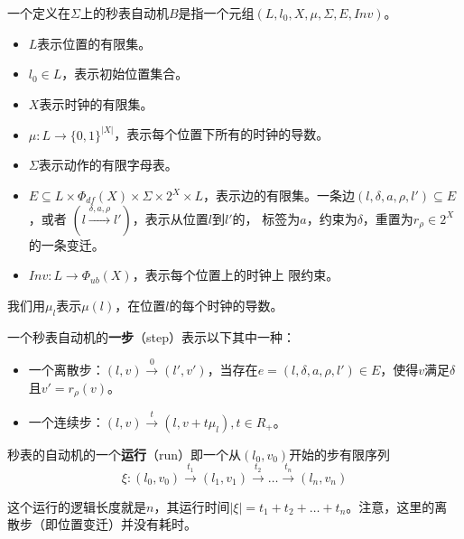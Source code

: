 \begin{definition}
	\label{def:SWA}
	一个定义在$\varSigma$上的秒表自动机$B$是指一个元组$(L,l_0,X,\mu,\varSigma,
	E,Inv)$。
	\begin{itemize}
		\item $L$表示位置的有限集。
		\item $l_0\in L$，表示初始位置集合。
		\item $X$表示时钟的有限集。
		\item $\mu:L\longrightarrow \{0,1\}^{|X|}$，表示每个位置下所有的时钟的导数。
		\item $\varSigma$表示动作的有限字母表。
		\item $E\subseteq L\times \varPhi_{df}(X)\times \varSigma \times 2^X
		\times L$，表示边的有限集。一条边$(l,\delta,a,\rho,l')\subseteq E$，或者
		$(l\stackrel{\delta,a,\rho}{\longrightarrow}l')$，表示从位置$l$到$l'$的，
		标签为$a$，约束为$\delta$，重置为$r_\rho \in 2^X$的一条变迁。
		\item $Inv:L\longrightarrow \varPhi_{ub}(X)$，表示每个位置上的时钟上
		限约束。
	\end{itemize}
\end{definition}

我们用$\mu_l$表示$\mu(l)$，在位置$l$的每个时钟的导数。

\begin{definition}
	\label{def:step}
	一个秒表自动机的\textbf{一步}（step）表示以下其中一种：
	\begin{itemize}
		\item 一个离散步：$(l,v)\stackrel{0}{\longrightarrow}(l',v')$，当存在$e=(l,
		\delta,a,\rho,l')\in E$，使得$v$满足$\delta$且$v'=r_\rho(v)$。
		\item 一个连续步：$(l,v)\stackrel{t}{\longrightarrow}(l,v+t\mu_l), t\in R_+$。
	\end{itemize}
\end{definition}

\begin{definition}
	\label{def:run}
	秒表的自动机的一个\textbf{运行}（run）即一个从$(l_0,v_0)$开始的步有限序列
	\begin{equation}
		\xi: (l_0,v_0)\stackrel{t_1}{\longrightarrow}(l_1,v_1)\stackrel{t_2}
		{\longrightarrow}\dots\stackrel{t_n}{\longrightarrow}(l_n,v_n)
	\end{equation}
\end{definition}

这个运行的逻辑长度就是$n$，其运行时间$|\xi|=t_1+t_2+\dots+t_n$。注意，这里的离
散步（即位置变迁）并没有耗时。

